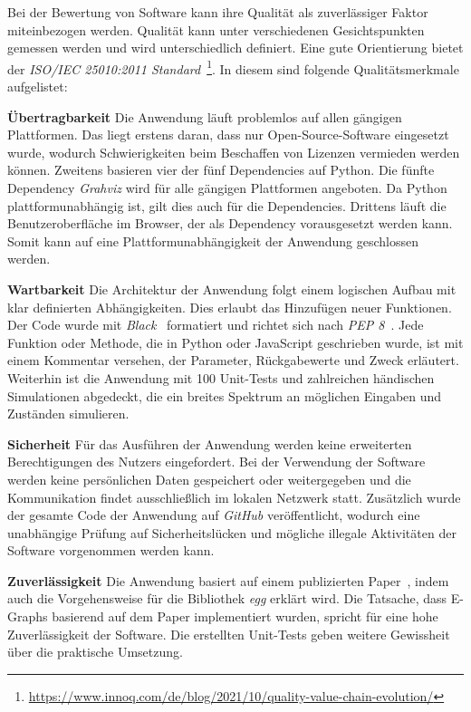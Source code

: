 Bei der Bewertung von Software kann ihre Qualität als zuverlässiger Faktor miteinbezogen werden. Qualität kann unter verschiedenen Gesichtspunkten gemessen werden und wird
unterschiedlich definiert. Eine gute Orientierung bietet der \textit{ISO/IEC 25010:2011 Standard}~\footnote{\hspace{1.5mm}\url{https://www.innoq.com/de/blog/2021/10/quality-value-chain-evolution/}}. 
In diesem sind folgende Qualitätsmerkmale aufgelistet:

\noindent\textbf{Übertragbarkeit} Die Anwendung läuft problemlos auf allen gängigen Plattformen. Das liegt erstens daran, dass nur Open-Source-Software eingesetzt wurde,
wodurch Schwierigkeiten beim Beschaffen von Lizenzen vermieden werden können. 
Zweitens basieren vier der fünf Dependencies auf Python. Die fünfte Dependency \textit{Grahviz} wird für alle gängigen Plattformen angeboten. Da Python plattformunabhängig ist, gilt dies auch
für die Dependencies.
Drittens läuft die Benutzeroberfläche im Browser, der als Dependency vorausgesetzt werden kann.
Somit kann auf eine Plattformunabhängigkeit der Anwendung geschlossen werden.

\noindent\textbf{Wartbarkeit} Die Architektur der Anwendung folgt einem logischen Aufbau mit klar definierten Abhängigkeiten. Dies erlaubt das Hinzufügen neuer Funktionen.
Der Code wurde mit \textit{Black}~\cite{black} formatiert und richtet sich nach \textit{PEP 8}~\cite{pep}. Jede Funktion oder Methode, die in Python oder JavaScript geschrieben wurde, 
ist mit einem Kommentar versehen, der Parameter, Rückgabewerte und Zweck erläutert. Weiterhin ist die Anwendung mit 100 Unit-Tests und zahlreichen händischen Simulationen abgedeckt, die ein breites Spektrum an 
möglichen Eingaben und Zuständen simulieren.

\noindent\textbf{Sicherheit} Für das Ausführen der Anwendung werden keine erweiterten Berechtigungen des Nutzers eingefordert. Bei der Verwendung der Software werden keine persönlichen Daten gespeichert 
oder weitergegeben und die Kommunikation findet ausschließlich im lokalen Netzwerk statt.
Zusätzlich wurde der gesamte Code der Anwendung auf \textit{GitHub} veröffentlicht, wodurch eine unabhängige Prüfung auf Sicherheitslücken und mögliche illegale Aktivitäten der Software vorgenommen werden kann.

\noindent\textbf{Zuverlässigkeit} Die Anwendung basiert auf einem publizierten Paper~\cite{2021-egg}, indem auch die Vorgehensweise für die Bibliothek \textit{egg} erklärt wird.
Die Tatsache, dass E-Graphs basierend auf dem Paper implementiert wurden, spricht für eine hohe Zuverlässigkeit der Software.
Die erstellten Unit-Tests geben weitere Gewissheit über die praktische Umsetzung.

